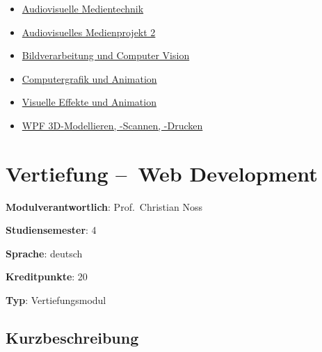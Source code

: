 \begin{itemize}
\tightlist
\item
  \hyperref[/mi-2017/modulbeschreibungen-bachelor/BA_VC-audiovisuelle-medientechnik]{Audiovisuelle Medientechnik}
\item
  \hyperref[/mi-2017/modulbeschreibungen-bachelor/BA_VC-audiovisuelles-medienprojekt-2]{Audiovisuelles Medienprojekt 2}
\item
  \hyperref[/mi-2017/modulbeschreibungen-bachelor/BA_VC-bildverarbeitung-und-computer-vision]{Bildverarbeitung und Computer Vision}
\item
  \hyperref[/mi-2017/modulbeschreibungen-bachelor/BA_VC-computergrafik-und-animation]{Computergrafik und Animation}
\item
  \hyperref[/mi-2017/modulbeschreibungen-bachelor/BA_VC-visuelle-effekte-und-animation]{Visuelle Effekte und Animation}
\item
  \hyperref[/mi-2017/modulbeschreibungen-bachelor/BA_WPF-3D-MSD]{WPF 3D-Modellieren, -Scannen, -Drucken}
\end{itemize}

\hypertarget{vertiefung-web-developmentpathlabelmi-2017modulbeschreibungen-bachelorba_vertiefung-web_development}{%
\chapter{Vertiefung --~Web
Development\label{/mi-2017/modulbeschreibungen-bachelor/BA_Vertiefung-Web_Development}}\label{vertiefung-web-developmentpathlabelmi-2017modulbeschreibungen-bachelorba_vertiefung-web_development}}

\begin{modulHead}
\textbf{Modulverantwortlich}: Prof.~Christian
Noss
\end{modulHead}
\begin{modulHead}
\textbf{Studiensemester}:
4
\end{modulHead}
\begin{modulHead}
\textbf{Sprache}:
deutsch
\end{modulHead}
\begin{modulHead}
\textbf{Kreditpunkte}:
20
\end{modulHead}
\begin{modulHead}
\textbf{Typ}:
Vertiefungsmodul
\end{modulHead}


\hypertarget{kurzbeschreibungpathlabelmi-2017modulbeschreibungen-bachelorba_vertiefung-web_development}{%
\section*{Kurzbeschreibung\label{/mi-2017/modulbeschreibungen-bachelor/BA_Vertiefung-Web_Development}}\label{kurzbeschreibungpathlabelmi-2017modulbeschreibungen-bachelorba_vertiefung-web_development}}

